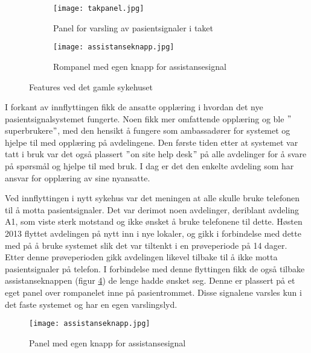 \begin{figure}[H]
        \centering
        \begin{subfigure}[b]{1.0\textwidth}
        		\centering
                \texttt{[image: takpanel.jpg]}
                \caption{Panel for varsling av pasientsignaler i taket}
                \label{takpanel}
        \end{subfigure}
        
        \begin{subfigure}[b]{1.0\textwidth}
        		\centering
                \texttt{[image: assistanseknapp.jpg]}
                \caption{Rompanel med egen knapp for assistansesignal}
                \label{assistanseknapp_gammel}
        \end{subfigure}
        \caption{Features ved det gamle sykehuset}
        \label{takass}
\end{figure}


\noindent
I forkant av innflyttingen fikk de ansatte opplæring i hvordan det nye pasientsignalsystemet fungerte. Noen fikk mer omfattende opplæring og ble $"$superbrukere$"$, med den hensikt å fungere som ambassadører for systemet og hjelpe til med opplæring på avdelingene. Den første tiden etter at systemet var tatt i bruk var det også plassert $"$on site help desk$"$ på alle avdelinger for å svare på spørsmål og hjelpe til med bruk. I dag er det den enkelte avdeling som har ansvar for opplæring av sine nyansatte. 

\noindent
Ved innflyttingen i nytt sykehus var det meningen at alle skulle bruke telefonen til å motta pasientsignaler. Det var derimot noen avdelinger, deriblant avdeling A1, som viste sterk motstand og ikke ønsket å bruke telefonene til dette.
Høsten 2013 flyttet avdelingen på nytt inn i nye lokaler, og gikk i forbindelse med dette med på å bruke systemet slik det var tiltenkt i en prøveperiode på 14 dager. Etter denne prøveperioden gikk avdelingen likevel tilbake til å ikke motta pasientsignaler på telefon. I forbindelse med denne flyttingen fikk de også tilbake assistanseknappen (figur \ref{assistanseknapp_ny}) de lenge hadde ønsket seg. Denne er plassert på et eget panel over rompanelet inne på pasientrommet. Disse signalene varsles kun i det faste systemet og har en egen varslingslyd.

\begin{figure}[H]
\centering
\texttt{[image: assistanseknapp.jpg]}
\caption{Panel med egen knapp for assistansesignal}
\label{assistanseknapp_ny}
\end{figure}


